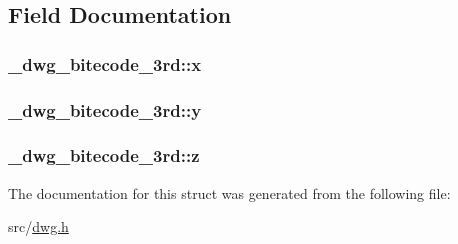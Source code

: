 \subsection{\-Field \-Documentation}
\hypertarget{struct__dwg__bitecode__3rd_a7d2bd8794e5c3ad15aeb87584631f6ae}{
\subsubsection[{x}]{ {\bf \-\_\-dwg\-\_\-bitecode\-\_\-3rd\-::x}}}\label{struct__dwg__bitecode__3rd_a7d2bd8794e5c3ad15aeb87584631f6ae}
\hypertarget{struct__dwg__bitecode__3rd_a43e6aa434ef456e73fbc9647c6ca63a5}{
\subsubsection[{y}]{ {\bf \-\_\-dwg\-\_\-bitecode\-\_\-3rd\-::y}}}\label{struct__dwg__bitecode__3rd_a43e6aa434ef456e73fbc9647c6ca63a5}
\hypertarget{struct__dwg__bitecode__3rd_a4a2a9a6560e774f25d562513f7aee734}{
\subsubsection[{z}]{ {\bf \-\_\-dwg\-\_\-bitecode\-\_\-3rd\-::z}}}\label{struct__dwg__bitecode__3rd_a4a2a9a6560e774f25d562513f7aee734}


\-The documentation for this struct was generated from the following file\-:\begin{DoxyCompactItemize}
\item 
src/\hyperlink{dwg_8h}{dwg.\-h}\end{DoxyCompactItemize}
